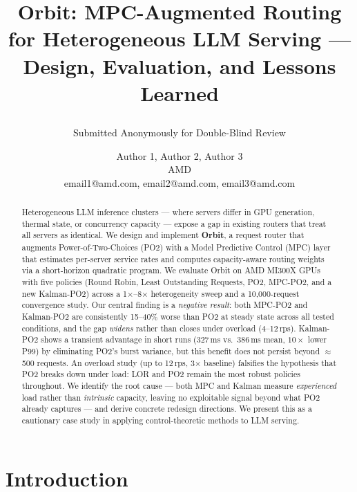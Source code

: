 \documentclass[blind]{gtac}
\title{Orbit: MPC-Augmented Routing for Heterogeneous LLM Serving --- Design, Evaluation, and Lessons Learned\subtitle{Submitted Anonymously for Double-Blind Review}}
\author{Author 1, Author 2, Author 3 \\
AMD \\
email1@amd.com, email2@amd.com, email3@amd.com}
\begin{document}
\maketitle

\pagestyle{fancy}
\fancyhf{}
\cfoot{\thepage}
\renewcommand{\headrulewidth}{0pt}
\thispagestyle{fancy}

\begin{abstract}
Heterogeneous LLM inference clusters — where servers differ in GPU generation,
thermal state, or concurrency capacity — expose a gap in existing routers that
treat all servers as identical. We design and implement \textbf{Orbit}, a
request router that augments Power-of-Two-Choices (PO2) with a Model Predictive
Control (MPC) layer that estimates per-server service rates and computes
capacity-aware routing weights via a short-horizon quadratic program.
We evaluate Orbit on AMD MI300X GPUs with five policies (Round Robin, Least
Outstanding Requests, PO2, MPC-PO2, and a new Kalman-PO2) across a
1$\times$--8$\times$ heterogeneity sweep and a 10,000-request convergence study.
Our central finding is a \emph{negative result}: both MPC-PO2 and Kalman-PO2
are consistently 15--40\% worse than PO2 at steady state across all tested
conditions, and the gap \emph{widens} rather than closes under overload
(4--12\,rps). Kalman-PO2 shows a transient advantage in short runs
(327\,ms vs.\ 386\,ms mean, $10\times$ lower P99) by eliminating PO2's
burst variance, but this benefit does not persist beyond $\approx$500
requests. An overload study (up to 12\,rps, 3$\times$ baseline) falsifies
the hypothesis that PO2 breaks down under load: LOR and PO2 remain the
most robust policies throughout.
We identify the root cause --- both MPC and Kalman measure
\emph{experienced} load rather than \emph{intrinsic} capacity, leaving no
exploitable signal beyond what PO2 already captures --- and derive
concrete redesign directions. We present this as a cautionary case study
in applying control-theoretic methods to LLM serving.
\end{abstract}


\section{Introduction}
\end{document}

